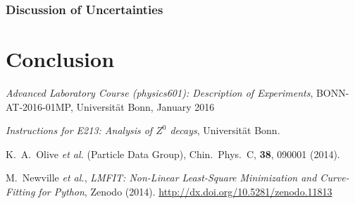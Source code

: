 \documentclass[11pt, a4paper]{article}
\numberwithin{equation}{section}
\begin{document}
\subsubsection{Discussion of Uncertainties}



\section{Conclusion}


\FloatBarrier
\vspace{\fill}
\begin{thebibliography}{19}
	\emph{Advanced Laboratory Course (physics601): Description of Experiments}, BONN-AT-2016-01MP, Universität Bonn, January 2016

	\emph{Instructions for E213: Analysis of $Z^0$ decays},
	Universität Bonn.
	
	K.\ A.\ Olive \textit{et al.} (Particle Data Group),
	Chin.\ Phys.\ C, \textbf{38}, 090001 (2014).

	M.\ Newville \textit{et al.},
	\emph{LMFIT: Non-Linear Least-Square Minimization and Curve-Fitting for Python}, Zenodo (2014). \url{http://dx.doi.org/10.5281/zenodo.11813}
\end{thebibliography}
\end{document}

